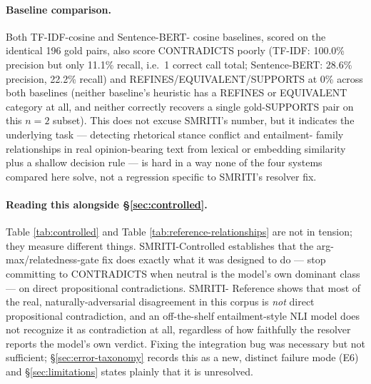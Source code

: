 \paragraph{Baseline comparison.} Both TF-IDF-cosine and Sentence-BERT-
cosine baselines, scored on the identical 196 gold pairs, also score
CONTRADICTS poorly (TF-IDF: 100.0\% precision but only 11.1\% recall,
i.e.\ 1 correct call total; Sentence-BERT: 28.6\% precision, 22.2\%
recall) and REFINES/EQUIVALENT/SUPPORTS at 0\% across both baselines
(neither baseline's heuristic has a REFINES or EQUIVALENT category at
all, and neither correctly recovers a single gold-SUPPORTS pair on this
$n=2$ subset). This does not excuse SMRITI's number, but it indicates the
underlying task --- detecting rhetorical stance conflict and entailment-
family relationships in real opinion-bearing text from lexical or
embedding similarity plus a shallow decision rule --- is hard in a way
none of the four systems compared here solve, not a regression specific
to SMRITI's resolver fix.

\paragraph{Reading this alongside \S\ref{sec:controlled}.} Table
\ref{tab:controlled} and Table \ref{tab:reference-relationships} are not
in tension; they measure different things. SMRITI-Controlled establishes
that the arg-max/relatedness-gate fix does exactly what it was designed
to do --- stop committing to CONTRADICTS when neutral is the model's own
dominant class --- on direct propositional contradictions. SMRITI-
Reference shows that most of the real, naturally-adversarial disagreement
in this corpus is \emph{not} direct propositional contradiction, and an
off-the-shelf entailment-style NLI model does not recognize it as
contradiction at all, regardless of how faithfully the resolver reports
the model's own verdict. Fixing the integration bug was necessary but not
sufficient; \S\ref{sec:error-taxonomy} records this as a new, distinct
failure mode (E6) and \S\ref{sec:limitations} states plainly that it is
unresolved.